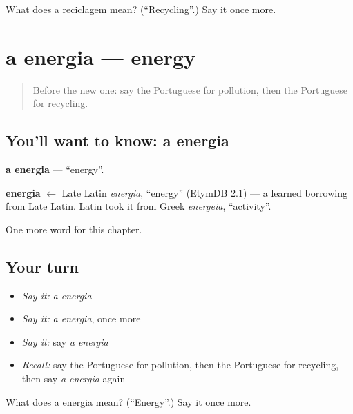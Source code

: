 \begin{tcolorbox}[breakable,colback=teal!4,colframe=teal!35!black,title={Before you move on}]
What does a reciclagem mean? (\textquotedblleft{}Recycling\textquotedblright{}.) Say it once more.
\end{tcolorbox}
\section[a energia]{a energia — energy}

\label{lesson:PT-C225-energia}



\begin{quote}
Before the new one: say the Portuguese for pollution, then the Portuguese for recycling.
\end{quote}

\subsection*{You'll want to know: a energia}
\textbf{a energia} — \textquotedblleft{}energy\textquotedblright{}.

\begin{cousinweb}
\textbf{energia} $\leftarrow$ Late Latin \emph{energia}, \textquotedblleft{}energy\textquotedblright{} (EtymDB 2.1) — a learned borrowing from Late Latin. Latin took it from Greek \emph{energeia}, \textquotedblleft{}activity\textquotedblright{}.
\end{cousinweb}

\begin{grammarlens}[title={What you've built}]
One more word for this chapter.
\end{grammarlens}

\subsection*{Your turn}
\begin{itemize}
\raggedright
  \item \emph{Say it:} \emph{a energia}
  \item \emph{Say it:} \emph{a energia}, once more
  \item \emph{Say it:} say \emph{a energia}
  \item \emph{Recall:} say the Portuguese for pollution, then the Portuguese for recycling, then say \emph{a energia} again
\end{itemize}

\begin{tcolorbox}[breakable,colback=teal!4,colframe=teal!35!black,title={Before you move on}]
What does a energia mean? (\textquotedblleft{}Energy\textquotedblright{}.) Say it once more.
\end{tcolorbox}
